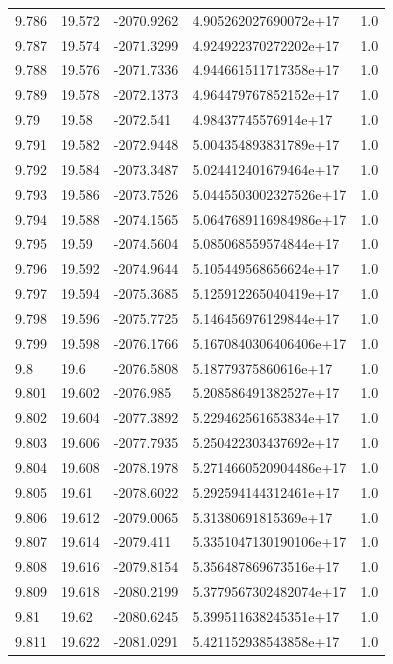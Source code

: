 \begin{tabular}{lllll}
9.786 & 19.572 & -2070.9262 & 4.905262027690072e+17 & 1.0 \\
9.787 & 19.574 & -2071.3299 & 4.924922370272202e+17 & 1.0 \\
9.788 & 19.576 & -2071.7336 & 4.944661511717358e+17 & 1.0 \\
9.789 & 19.578 & -2072.1373 & 4.964479767852152e+17 & 1.0 \\
9.79 & 19.58 & -2072.541 & 4.98437745576914e+17 & 1.0 \\
9.791 & 19.582 & -2072.9448 & 5.004354893831789e+17 & 1.0 \\
9.792 & 19.584 & -2073.3487 & 5.024412401679464e+17 & 1.0 \\
9.793 & 19.586 & -2073.7526 & 5.0445503002327526e+17 & 1.0 \\
9.794 & 19.588 & -2074.1565 & 5.0647689116984986e+17 & 1.0 \\
9.795 & 19.59 & -2074.5604 & 5.085068559574844e+17 & 1.0 \\
9.796 & 19.592 & -2074.9644 & 5.105449568656624e+17 & 1.0 \\
9.797 & 19.594 & -2075.3685 & 5.125912265040419e+17 & 1.0 \\
9.798 & 19.596 & -2075.7725 & 5.146456976129844e+17 & 1.0 \\
9.799 & 19.598 & -2076.1766 & 5.1670840306406406e+17 & 1.0 \\
9.8 & 19.6 & -2076.5808 & 5.18779375860616e+17 & 1.0 \\
9.801 & 19.602 & -2076.985 & 5.208586491382527e+17 & 1.0 \\
9.802 & 19.604 & -2077.3892 & 5.229462561653834e+17 & 1.0 \\
9.803 & 19.606 & -2077.7935 & 5.250422303437692e+17 & 1.0 \\
9.804 & 19.608 & -2078.1978 & 5.2714660520904486e+17 & 1.0 \\
9.805 & 19.61 & -2078.6022 & 5.292594144312461e+17 & 1.0 \\
9.806 & 19.612 & -2079.0065 & 5.31380691815369e+17 & 1.0 \\
9.807 & 19.614 & -2079.411 & 5.3351047130190106e+17 & 1.0 \\
9.808 & 19.616 & -2079.8154 & 5.356487869673516e+17 & 1.0 \\
9.809 & 19.618 & -2080.2199 & 5.3779567302482074e+17 & 1.0 \\
9.81 & 19.62 & -2080.6245 & 5.399511638245351e+17 & 1.0 \\
9.811 & 19.622 & -2081.0291 & 5.421152938543858e+17 & 1.0 \\

\end{tabular}
